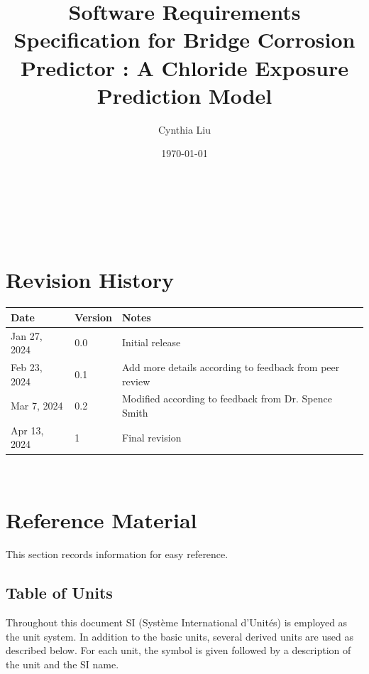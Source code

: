 \documentclass[12pt]{article}
\begin{document}
\title{Software Requirements Specification for Bridge Corrosion Predictor : A Chloride Exposure Prediction Model} 
\author{Cynthia Liu}
\date{\today}
	
\maketitle

~\newpage


\tableofcontents

~\newpage

\section*{Revision History}

\begin{tabularx}{\textwidth}{p{3cm}p{2cm}X}
\toprule {\bf Date} & {\bf Version} & {\bf Notes}\\
\midrule
Jan 27, 2024 & 0.0 & Initial release\\
Feb 23, 2024 & 0.1 & Add more details according to feedback from peer review\\
Mar 7, 2024 & 0.2 & Modified according to feedback from Dr. Spence Smith\\
Apr 13, 2024 & 1 & Final revision \\
\bottomrule
\end{tabularx}

~\newpage

\section{Reference Material}

This section records information for easy reference.

\subsection{Table of Units}

Throughout this document SI (Syst\`{e}me International d'Unit\'{e}s) is employed
as the unit system.  In addition to the basic units, several derived units are
used as described below.  For each unit, the symbol is given followed by a
description of the unit and the SI name.
~\newline
\end{document}
